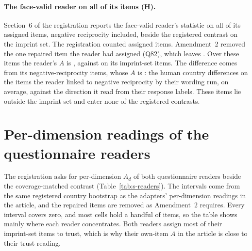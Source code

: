 \documentclass[12pt]{article}
\begin{document}
\paragraph{The face-valid reader on all of its items (H).} Section~6 of the registration reports the face-valid reader's statistic on all of its assigned items, negative reciprocity included, beside the registered contrast on the imprint set. The registration counted  assigned items. Amendment~2 removed the one repaired item the reader had assigned (Q82), which leaves . Over these items the reader's $A$ is , against  on its  imprint-set items. The difference comes from its  negative-reciprocity items, whose $A$ is : the human country differences on the items the reader linked to negative reciprocity by their wording run, on average, against the direction it read from their response labels. These items lie outside the imprint set and enter none of the registered contrasts.

\section{Per-dimension readings of the questionnaire readers}\label{sec:s-readers}

The registration asks for per-dimension $A_d$ of both questionnaire readers beside the coverage-matched contrast (Table~\ref{tab:s-readers}). The intervals come from the same registered country bootstrap as the adapters' per-dimension readings in the article, and the repaired items are removed as Amendment~2 requires. Every interval covers zero, and most cells hold a handful of items, so the table shows mainly where each reader concentrates. Both readers assign most of their imprint-set items to trust, which is why their own-item $A$ in the article is close to their trust reading.
\end{document}
